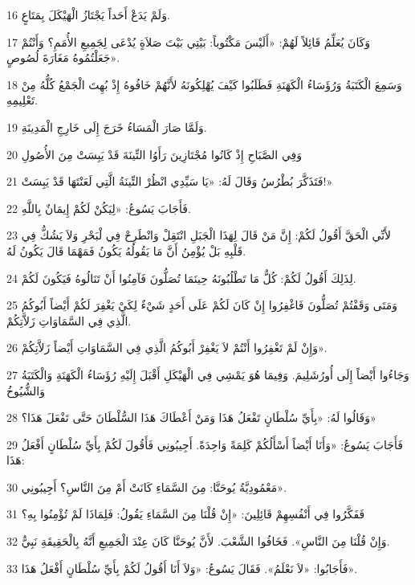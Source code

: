 \par 16 وَلَمْ يَدَعْ أَحَداً يَجْتَازُ الْهَيْكَلَ بِمَتَاعٍ.
\par 17 وَكَانَ يُعَلِّمُ قَائِلاً لَهُمْ: «أَلَيْسَ مَكْتُوباً: بَيْتِي بَيْتَ صَلاَةٍ يُدْعَى لِجَمِيعِ الأُمَمِ؟ وَأَنْتُمْ جَعَلْتُمُوهُ مَغَارَةَ لُصُوصٍ».
\par 18 وَسَمِعَ الْكَتَبَةُ وَرُؤَسَاءُ الْكَهَنَةِ فَطَلَبُوا كَيْفَ يُهْلِكُونَهُ لأَنَّهُمْ خَافُوهُ إِذْ بُهِتَ الْجَمْعُ كُلُّهُ مِنْ تَعْلِيمِهِ.
\par 19 وَلَمَّا صَارَ الْمَسَاءُ خَرَجَ إِلَى خَارِجِ الْمَدِينَةِ.
\par 20 وَفِي الصَّبَاحِ إِذْ كَانُوا مُجْتَازِينَ رَأَوُا التِّينَةَ قَدْ يَبِسَتْ مِنَ الأُصُولِ
\par 21 فَتَذَكَّرَ بُطْرُسُ وَقَالَ لَهُ: «يَا سَيِّدِي انْظُرْ التِّينَةُ الَّتِي لَعَنْتَهَا قَدْ يَبِسَتْ!»
\par 22 فَأَجَابَ يَسُوعُ: «لِيَكُنْ لَكُمْ إِيمَانٌ بِاللَّهِ.
\par 23 لأَنِّي الْحَقَّ أَقُولُ لَكُمْ: إِنَّ مَنْ قَالَ لِهَذَا الْجَبَلِ انْتَقِلْ وَانْطَرِحْ فِي لْبَحْرِ وَلاَ يَشُكُّ فِي قَلْبِهِ بَلْ يُؤْمِنُ أَنَّ مَا يَقُولُهُ يَكُونُ فَمَهْمَا قَالَ يَكُونُ لَهُ.
\par 24 لِذَلِكَ أَقُولُ لَكُمْ: كُلُّ مَا تَطْلُبُونَهُ حِينَمَا تُصَلُّونَ فَآمِنُوا أَنْ تَنَالُوهُ فَيَكُونَ لَكُمْ.
\par 25 وَمَتَى وَقَفْتُمْ تُصَلُّونَ فَاغْفِرُوا إِنْ كَانَ لَكُمْ عَلَى أَحَدٍ شَيْءٌ لِكَيْ يَغْفِرَ لَكُمْ أَيْضاً أَبُوكُمُ الَّذِي فِي السَّمَاوَاتِ زَلاَّتِكُمْ.
\par 26 وَإِنْ لَمْ تَغْفِرُوا أَنْتُمْ لاَ يَغْفِرْ أَبُوكُمُ الَّذِي فِي السَّمَاوَاتِ أَيْضاً زَلاَّتِكُمْ».
\par 27 وَجَاءُوا أَيْضاً إِلَى أُورُشَلِيمَ. وَفِيمَا هُوَ يَمْشِي فِي الْهَيْكَلِ أَقْبَلَ إِلَيْهِ رُؤَسَاءُ الْكَهَنَةِ وَالْكَتَبَةُ وَالشُّيُوخُ
\par 28 وَقَالُوا لَهُ: «بِأَيِّ سُلْطَانٍ تَفْعَلُ هَذَا وَمَنْ أَعْطَاكَ هَذَا السُّلْطَانَ حَتَّى تَفْعَلَ هَذَا؟»
\par 29 فَأَجَابَ يَسُوعُ: «وَأَنَا أَيْضاً أَسْأَلُكُمْ كَلِمَةً وَاحِدَةً. أَجِيبُونِي فَأَقُولَ لَكُمْ بِأَيِّ سُلْطَانٍ أَفْعَلُ هَذَا:
\par 30 مَعْمُودِيَّةُ يُوحَنَّا: مِنَ السَّمَاءِ كَانَتْ أَمْ مِنَ النَّاسِ؟ أَجِيبُونِي».
\par 31 فَفَكَّرُوا فِي أَنْفُسِهِمْ قَائِلِينَ: «إِنْ قُلْنَا مِنَ السَّمَاءِ يَقُولُ: فَلِمَاذَا لَمْ تُؤْمِنُوا بِهِ؟
\par 32 وَإِنْ قُلْنَا مِنَ النَّاسِ». فَخَافُوا الشَّعْبَ. لأَنَّ يُوحَنَّا كَانَ عِنْدَ الْجَمِيعِ أَنَّهُ بِالْحَقِيقَةِ نَبِيٌّ.
\par 33 فَأَجَابُوا: «لاَ نَعْلَمُ». فَقَالَ يَسُوعُ: «وَلاَ أَنَا أَقُولُ لَكُمْ بِأَيِّ سُلْطَانٍ أَفْعَلُ هَذَا».

